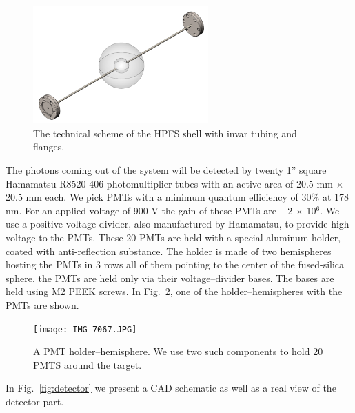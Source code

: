 \begin{figure}
   \centering
   \includegraphics[width=0.6\textwidth]{sphere.png}
   \caption{The technical scheme of the HPFS shell with invar tubing and flanges.} 
   \label{fig:sphere}
\end{figure}


The photons coming out of the system will be detected by twenty 1'' square Hamamatsu R8520-406 photomultiplier 
tubes with an active area of 20.5 mm $\times$ 20.5 mm each. We pick PMTs with a minimum quantum efficiency of 30\% 
at 178 nm. For an applied voltage of 900 V the gain of these PMTs are ~ 2 $\times$ 10$^6$. We use a positive 
voltage divider, also manufactured by Hamamatsu, to provide high voltage to the PMTs.
These 20 PMTs are held with a special aluminum holder, coated with anti-reflection substance. The holder is made of two hemispheres hosting the PMTs in 
3 rows all of them pointing to the center of the fused-silica sphere. the PMTs are held only via their voltage--divider bases. The bases are held using M2 PEEK screws. 
In Fig.~\ref{fig:pmtholder}, one of the holder--hemispheres with the PMTs are shown.

\begin{figure}
   \centering
   \texttt{[image: IMG\_7067.JPG]}
   \caption{A PMT holder--hemisphere. We use two such components to hold 20 PMTS around the target.} 
   \label{fig:pmtholder}
\end{figure}


In Fig.~\ref{fig:detector} we present a CAD schematic as well as a real view of the detector part.

